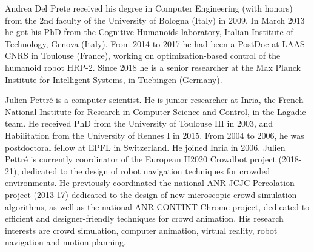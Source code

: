 \documentclass[journal]{IEEEtran}
\begin{document}
\begin{IEEEbiography}{Andrea Del Prete} received his degree in Computer
Engineering (with honors) from the 2nd faculty of
the University of Bologna (Italy) in 2009. In March
2013 he got his PhD from the Cognitive Humanoids
laboratory, Italian Institute of Technology, Genova
(Italy). From 2014 to 2017 he had been a PostDoc
at LAAS-CNRS in Toulouse (France), working on
optimization-based control of the humanoid robot
HRP-2. Since 2018 he is a senior researcher at
the Max Planck Institute for Intelligent Systems, in
Tuebingen (Germany).
\end{IEEEbiography}

\begin{IEEEbiography}{Julien Pettré}
is a computer scientist. He is junior researcher at Inria, the French National Institute for Research in Computer Science and Control, in the Lagadic team. He received PhD from the University of Toulouse III in 2003, and Habilitation from the University of Rennes I in 2015. From 2004 to 2006, he was postdoctoral fellow at EPFL in Switzerland. He joined Inria in 2006.
Julien Pettré is currently coordinator of the European H2020 Crowdbot project (2018-21), dedicated to the design of robot navigation techniques for crowded environments. He previously coordinated the national ANR JCJC Percolation project (2013-17) dedicated to the design of new microscopic crowd simulation algorithms, as well as the national ANR CONTINT Chrome project, dedicated to efficient and designer-friendly techniques for crowd animation.
His research interests are crowd simulation, computer animation, virtual reality, robot navigation and motion planning. 
\end{IEEEbiography}
\end{document}
